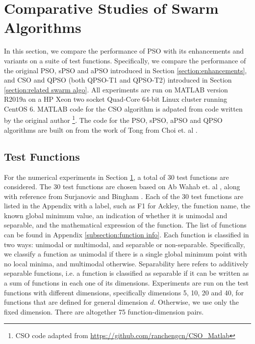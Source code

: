 \documentclass[12pt]{article}
\theoremstyle{definition}
\begin{document}
\newpage

\section{Comparative Studies of Swarm Algorithms}
\label{section:comparative studies}
In this section, we compare the performance of PSO with its enhancements and variants on a suite of test functions. Specifically, we compare the performance of the original PSO, sPSO and aPSO introduced in Section \ref{section:enhancements}, and CSO and QPSO (both QPSO-T1 and QPSO-T2) introduced in Section \ref{section:related swarm algo}. All experiments are run on MATLAB version R2019a on a HP Xeon two socket Quad-Core 64-bit Linux cluster running CentOS 6. MATLAB code for the CSO algorithm is adpated from code written by the original author \footnote{CSO code adapted from \url{https://github.com/ranchengcn/CSO_Matlab}}. The code for the PSO, sPSO, aPSO and QPSO algorithms are built on from the work of Tong from Choi et. al \cite{choi2020}.

\subsection{Test Functions}
\label{subsection:test functions}
For the numerical experiments in Section \ref{section:comparative studies}, a total of 30 test functions are considered. The 30 test functions are chosen based on Ab Wahab et. al \cite{plosreview2015}, along with reference from Surjanovic and Bingham \cite{simulationlib}. Each of the 30 test functions are listed in the Appendix with a label, such as F1 for Ackley, the function name, the known global minimum value, an indication of whether it is unimodal and separable, and the mathematical expression of the function. The list of functions can be found in Appendix \ref{subsection:function info}. Each function is classified in two ways: unimodal or multimodal, and separable or non-separable. Specifically, we classify a function as unimodal if there is a single global minimum point with no local minima, and multimodal otherwise. Separability here refers to additively separable functions, i.e. a function is classified as separable if it can be written as a sum of functions in each one of its dimensions. Experiments are run on the test functions with different dimensions, specifically dimensions 5, 10, 20 and 40, for functions that are defined for general dimension $d$. Otherwise, we use only the fixed dimension. There are altogether 75 function-dimension pairs.
\end{document}
